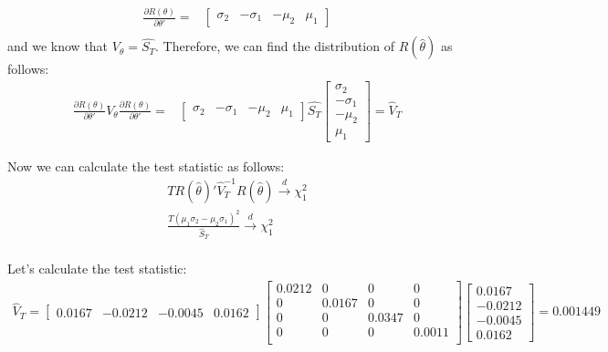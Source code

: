 \begin{enumerate}[(a)]
\begin{equation*}
\begin{aligned}
    \frac{\partial R(\theta)}{\partial \theta'} = & \begin{bmatrix}
      \sigma_2 & -\sigma_1 & -\mu_2 & \mu_1
    \end{bmatrix} \\
  \end{aligned}
\end{equation*}
and we know that $V_{\theta} = \hat{S_T}$. Therefore, we can find the distribution of $R(\hat{\theta})$ as follows:
\begin{equation*}
\begin{aligned}
  \frac{\partial R(\theta)}{\partial \theta'}V_{\theta}\frac{\partial R(\theta)}{\partial \theta'} = & \begin{bmatrix}
    \sigma_2 & -\sigma_1 & -\mu_2 & \mu_1
  \end{bmatrix} \hat{S_T} \begin{bmatrix}
    \sigma_2 \\
    -\sigma_1 \\
    -\mu_2 \\
    \mu_1
  \end{bmatrix}  = \hat{V}_T
\end{aligned}
\end{equation*}

Now we can calculate the test statistic as follows:
\begin{equation*}
  \begin{aligned}
    T R(\hat{\theta})' \hat{V}_T^{-1} R(\hat{\theta}) \xrightarrow{d} \chi^2_1 \\
    \frac{T(\mu_1\sigma_2 - \mu_2\sigma_1)^2}{\hat{S}_T} \xrightarrow{d} \chi^2_1 \\
  \end{aligned}
\end{equation*}
\end{enumerate}
Let's calculate the test statistic:
\begin{equation*}
  \begin{aligned}
    \hat{V}_T = \begin{bmatrix}
      0.0167 & -0.0212 & -0.0045 & 0.0162
    \end{bmatrix} \begin{bmatrix}
        0.0212 & 0 & 0 & 0\\
        0 & 0.0167 & 0 & 0\\
        0 & 0 & 0.0347 & 0 \\
        0 & 0 & 0 & 0.0011 \\
      \end{bmatrix} \begin{bmatrix}
        0.0167 \\
        -0.0212 \\
        -0.0045 \\
        0.0162
      \end{bmatrix} = 0.001449 \\
  \end{aligned}
\end{equation*}

